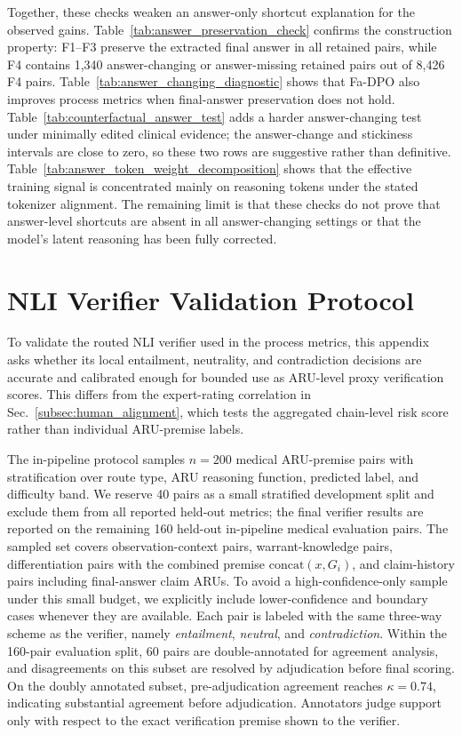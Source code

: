 \documentclass[a4paper,fleqn,doubleblind]{cas-sc}
\begin{document}
Together, these checks weaken an answer-only shortcut explanation for the observed gains. Table~\ref{tab:answer_preservation_check} confirms the construction property: F1--F3 preserve the extracted final answer in all retained pairs, while F4 contains 1,340 answer-changing or answer-missing retained pairs out of 8,426 F4 pairs. Table~\ref{tab:answer_changing_diagnostic} shows that Fa-DPO also improves process metrics when final-answer preservation does not hold. Table~\ref{tab:counterfactual_answer_test} adds a harder answer-changing test under minimally edited clinical evidence; the answer-change and stickiness intervals are close to zero, so these two rows are suggestive rather than definitive. Table~\ref{tab:answer_token_weight_decomposition} shows that the effective training signal is concentrated mainly on reasoning tokens under the stated tokenizer alignment. The remaining limit is that these checks do not prove that answer-level shortcuts are absent in all answer-changing settings or that the model's latent reasoning has been fully corrected.

\section{NLI Verifier Validation Protocol}
\label{app:nli_validation}

To validate the routed NLI verifier used in the process metrics, this appendix asks whether its local entailment, neutrality, and contradiction decisions are accurate and calibrated enough for bounded use as ARU-level proxy verification scores. This differs from the expert-rating correlation in Sec.~\ref{subsec:human_alignment}, which tests the aggregated chain-level risk score rather than individual ARU-premise labels.

The in-pipeline protocol samples $n=200$ medical ARU-premise pairs with stratification over route type, ARU reasoning function, predicted label, and difficulty band. We reserve 40 pairs as a small stratified development split and exclude them from all reported held-out metrics; the final verifier results are reported on the remaining 160 held-out in-pipeline medical evaluation pairs. The sampled set covers observation-context pairs, warrant-knowledge pairs, differentiation pairs with the combined premise $\mathrm{concat}(x, G_i)$, and claim-history pairs including final-answer claim ARUs. To avoid a high-confidence-only sample under this small budget, we explicitly include lower-confidence and boundary cases whenever they are available. Each pair is labeled with the same three-way scheme as the verifier, namely \textit{entailment}, \textit{neutral}, and \textit{contradiction}. Within the 160-pair evaluation split, 60 pairs are double-annotated for agreement analysis, and disagreements on this subset are resolved by adjudication before final scoring. On the doubly annotated subset, pre-adjudication agreement reaches $\kappa=0.74$, indicating substantial agreement before adjudication. Annotators judge support only with respect to the exact verification premise shown to the verifier.
\end{document}
